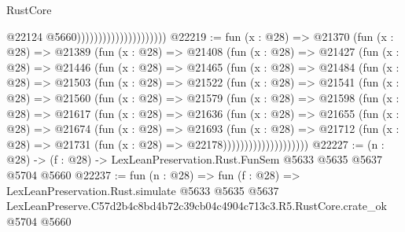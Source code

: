 \begin{lexlean}{RustCore}
\begin{coremodule}
                                              @22124
                                              @5660)))))))))))))))))))))
@22219 := fun (x : @28) =>
  @21370
    (fun (x : @28) =>
    @21389
      (fun (x : @28) =>
      @21408
        (fun (x : @28) =>
        @21427
          (fun (x : @28) =>
          @21446
            (fun (x : @28) =>
            @21465
              (fun (x : @28) =>
              @21484
                (fun (x : @28) =>
                @21503
                  (fun (x : @28) =>
                  @21522
                    (fun (x : @28) =>
                    @21541
                      (fun (x : @28) =>
                      @21560
                        (fun (x : @28) =>
                        @21579
                          (fun (x : @28) =>
                          @21598
                            (fun (x : @28) =>
                            @21617
                              (fun (x : @28) =>
                              @21636
                                (fun (x : @28) =>
                                @21655
                                  (fun (x : @28) =>
                                  @21674
                                    (fun (x : @28) =>
                                    @21693
                                      (fun (x : @28) =>
                                      @21712
                                        (fun (x : @28) =>
                                        @21731 (fun (x : @28) => @22178))))))))))))))))))))
@22227 := (n : @28) -> (f : @28) -> LexLeanPreservation.Rust.FunSem @5633 @5635 @5637 @5704 @5660
@22237 := fun (n : @28) =>
  fun (f : @28) =>
  LexLeanPreservation.Rust.simulate
    @5633
    @5635
    @5637
    LexLeanPreserve.C57d2b4c8bd4b72c39cb04c4904c713c3.R5.RustCore.crate_ok
    @5704
    @5660
\end{coremodule}
\end{lexlean}
